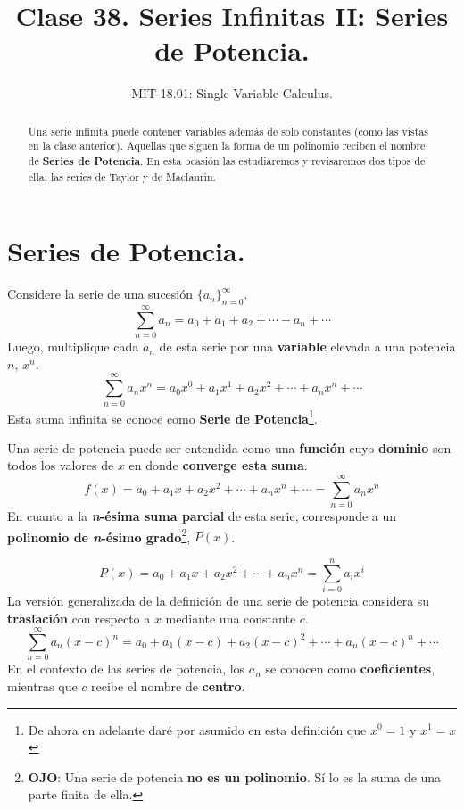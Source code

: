\documentclass[12pt]{article}
\title{Clase 38. Series Infinitas II: Series de Potencia.}
\author{MIT 18.01: Single Variable Calculus.}
\date{}
\begin{document}
\maketitle

\begin{abstract}
\noindent Una serie infinita puede contener variables además de solo constantes (como las vistas en la clase anterior). Aquellas que siguen la forma de un polinomio reciben el nombre de \textbf{Series de Potencia}. En esta ocasión las estudiaremos y revisaremos dos tipos de ella: las series de Taylor y de Maclaurin.
\end{abstract}


\section{Series de Potencia.}

Considere la serie de una sucesión $\{a_{n}\}_{n = 0}^{\infty}$.
\[
  \sum_{n = 0}^{\infty} a_{n} = a_{0} + a_{1} + a_{2} + \cdots + a_{n} + \cdots
\]
Luego, multiplique cada $a_{n}$ de esta serie por una \textbf{variable} elevada a una potencia $n$, $x^{n}$.
\[
  \sum_{n = 0}^{\infty} a_{n}x^{n} = a_{0}x^{0} + a_{1}x^{1} + a_{2}x^{2} + \cdots + a_{n}x^{n} + \cdots
\]
Esta suma infinita se conoce como \textbf{Serie de Potencia}\footnote{De ahora en adelante daré por asumido en esta definición que $x^{0} = 1$ y $x^{1} = x$}.

Una serie de potencia puede ser entendida como una \textbf{función} cuyo \textbf{dominio} son todos los valores de $x$ en donde \textbf{converge esta suma}.
\[
  f(x) = a_{0} + a_{1}x + a_{2}x^{2} + \cdots + a_{n}x^{n} + \cdots = \sum_{n = 0}^{\infty} a_{n}x^{n}
\]
En cuanto a la \textbf{\textit{n}-ésima suma parcial} de esta serie, corresponde a un \textbf{polinomio de \textit{n}-ésimo grado}\footnote{\textbf{OJO}: Una serie de potencia \textbf{no es un polinomio}. Sí lo es la suma de una parte finita de ella.}, $P(x)$.

\[
  P(x) = a_{0} + a_{1}x + a_{2}x^{2} + \cdots + a_{n}x^{n} = \sum_{i = 0}^{n} a_{i}x^{i}
\]
La versión generalizada de la definición de una serie de potencia considera su \textbf{traslación} con respecto a $x$ mediante una constante $c$.
\[
  \sum_{n = 0}^{\infty} a_{n} (x - c)^{n} = a_{0} + a_{1} (x - c) + a_{2} (x - c)^{2} + \cdots + a_{n} (x - c)^{n} + \cdots
\]
En el contexto de las series de potencia, los $a_{n}$ se conocen como \textbf{coeficientes}, mientras que $c$ recibe el nombre de \textbf{centro}.
\end{document}

